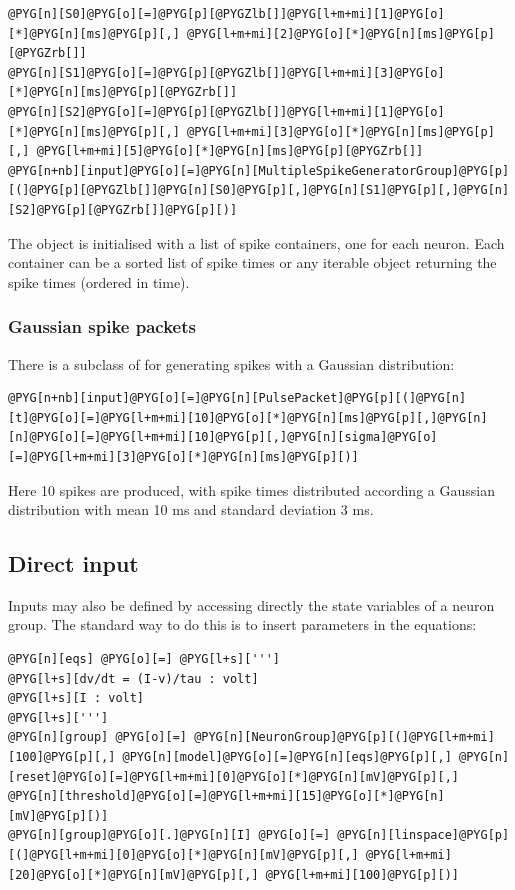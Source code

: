 \documentclass[letterpaper,10pt,english]{manual}
\begin{document}
\begin{Verbatim}[commandchars=@\[\]]
@PYG[n][S0]@PYG[o][=]@PYG[p][@PYGZlb[]]@PYG[l+m+mi][1]@PYG[o][*]@PYG[n][ms]@PYG[p][,] @PYG[l+m+mi][2]@PYG[o][*]@PYG[n][ms]@PYG[p][@PYGZrb[]]
@PYG[n][S1]@PYG[o][=]@PYG[p][@PYGZlb[]]@PYG[l+m+mi][3]@PYG[o][*]@PYG[n][ms]@PYG[p][@PYGZrb[]]
@PYG[n][S2]@PYG[o][=]@PYG[p][@PYGZlb[]]@PYG[l+m+mi][1]@PYG[o][*]@PYG[n][ms]@PYG[p][,] @PYG[l+m+mi][3]@PYG[o][*]@PYG[n][ms]@PYG[p][,] @PYG[l+m+mi][5]@PYG[o][*]@PYG[n][ms]@PYG[p][@PYGZrb[]]
@PYG[n+nb][input]@PYG[o][=]@PYG[n][MultipleSpikeGeneratorGroup]@PYG[p][(]@PYG[p][@PYGZlb[]]@PYG[n][S0]@PYG[p][,]@PYG[n][S1]@PYG[p][,]@PYG[n][S2]@PYG[p][@PYGZrb[]]@PYG[p][)]
\end{Verbatim}

The object is initialised with a list of spike containers, one for each neuron.
Each container can be a sorted list of spike times or any iterable object returning
the spike times (ordered in time).


\subsubsection{Gaussian spike packets}

There is a subclass of \hyperlink{brian.SpikeGeneratorGroup}{} for generating spikes with a Gaussian
distribution:

\begin{Verbatim}[commandchars=@\[\]]
@PYG[n+nb][input]@PYG[o][=]@PYG[n][PulsePacket]@PYG[p][(]@PYG[n][t]@PYG[o][=]@PYG[l+m+mi][10]@PYG[o][*]@PYG[n][ms]@PYG[p][,]@PYG[n][n]@PYG[o][=]@PYG[l+m+mi][10]@PYG[p][,]@PYG[n][sigma]@PYG[o][=]@PYG[l+m+mi][3]@PYG[o][*]@PYG[n][ms]@PYG[p][)]
\end{Verbatim}

Here 10 spikes are produced, with spike times distributed according a Gaussian distribution with
mean 10 ms and standard deviation 3 ms.


\subsection{Direct input}

Inputs may also be defined by accessing directly the state variables of a neuron group. The standard way
to do this is to insert parameters in the equations:

\begin{Verbatim}[commandchars=@\[\]]
@PYG[n][eqs] @PYG[o][=] @PYG[l+s][''']
@PYG[l+s][dv/dt = (I-v)/tau : volt]
@PYG[l+s][I : volt]
@PYG[l+s][''']
@PYG[n][group] @PYG[o][=] @PYG[n][NeuronGroup]@PYG[p][(]@PYG[l+m+mi][100]@PYG[p][,] @PYG[n][model]@PYG[o][=]@PYG[n][eqs]@PYG[p][,] @PYG[n][reset]@PYG[o][=]@PYG[l+m+mi][0]@PYG[o][*]@PYG[n][mV]@PYG[p][,] @PYG[n][threshold]@PYG[o][=]@PYG[l+m+mi][15]@PYG[o][*]@PYG[n][mV]@PYG[p][)]
@PYG[n][group]@PYG[o][.]@PYG[n][I] @PYG[o][=] @PYG[n][linspace]@PYG[p][(]@PYG[l+m+mi][0]@PYG[o][*]@PYG[n][mV]@PYG[p][,] @PYG[l+m+mi][20]@PYG[o][*]@PYG[n][mV]@PYG[p][,] @PYG[l+m+mi][100]@PYG[p][)]
\end{Verbatim}
\end{document}
